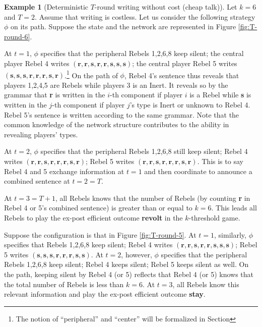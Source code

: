 \documentclass[12pt,letter]{article}
\theoremstyle{definition}
\newtheorem{example}{Example}
\theoremstyle{remark}
\theoremstyle{claim}
\begin{document}
%
\begin{example}[Deterministic $T$-round writing without cost (cheap talk)]
\label{ex:cheap_talk}
Let $k=6$ and $T=2$. Assume that writing is costless. Let us consider the following strategy $\phi$ on its path. Suppose the state and the network are represented in Figure \ref{fig:T-round-6}. 

At $t=1$, $\phi$ specifies that the peripheral Rebels 1,2,6,8 keep silent; the central player Rebel 4 writes $(\textbf{r},\textbf{r},\textbf{s},\textbf{r},\textbf{r},\textbf{s},\textbf{s},\textbf{s})$; the central player Rebel 5 writes $(\textbf{s},\textbf{s},\textbf{s},\textbf{r},\textbf{r},\textbf{r},\textbf{s},\textbf{r})$.\footnote{The notion of ``peripheral'' and ``center'' will be formalized in Section} On the path of $\phi$, Rebel 4's sentence thus reveals that players 1,2,4,5 are Rebels while players 3 is an Inert. It reveals so by the grammar that \textbf{r} is written in the $i$-th component if player $i$ is a Rebel while  \textbf{s} is written in the $j$-th component if player $j$'s type is Inert or unknown to Rebel 4. Rebel 5's sentence is written according to the same grammar. Note that the common knowledge of the network structure contributes to the ability in revealing players' types. 

At $t=2$, $\phi$ specifies that the peripheral Rebels 1,2,6,8 still keep silent; Rebel 4 writes $(\textbf{r},\textbf{r},\textbf{s},\textbf{r},\textbf{r},\textbf{r},\textbf{s},\textbf{r})$; Rebel 5 writes $(\textbf{r},\textbf{r},\textbf{s},\textbf{r},\textbf{r},\textbf{r},\textbf{s},\textbf{r})$. This is to say Rebel 4 and 5 exchange information at $t=1$ and then coordinate to announce a combined sentence at $t=2=T$. 

At $t=3=T+1$, all Rebels knows that the number of Rebels (by counting \textbf{r} in Rebel 4 or 5's combined sentence) is greater than or equal to $k=6$. This leads all Rebels to play the ex-post efficient outcome \textbf{revolt} in the $k$-threshold game. 

Suppose the configuration is that in Figure \ref{fig:T-round-5}. At $t=1$, similarly, $\phi$ specifies that Rebels 1,2,6,8 keep silent; Rebel 4 writes $(\textbf{r},\textbf{r},\textbf{s},\textbf{r},\textbf{r},\textbf{s},\textbf{s},\textbf{s})$; Rebel 5 writes $(\textbf{s},\textbf{s},\textbf{s},\textbf{r},\textbf{r},\textbf{r},\textbf{s},\textbf{s})$. At $t=2$, however, $\phi$ specifies that the peripheral Rebels 1,2,6,8 keep silent; Rebel 4 keeps silent; Rebel 5 keeps silent as well. On the path, keeping silent by Rebel 4 (or 5) reflects that Rebel 4 (or 5) knows that the total number of Rebels is less than $k=6$. At $t=3$, all Rebels know this relevant information and play the ex-post efficient outcome \textbf{stay}.


\end{example}
\end{document}
